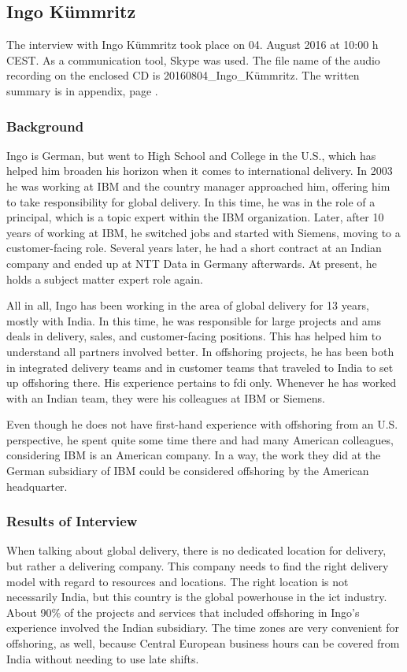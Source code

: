 \subsection{Ingo K\"ummritz}
The interview with Ingo K\"ummritz took place on 04. August 2016 at 10:00 h CEST. As a communication tool, Skype was used. The file name of the audio recording on the enclosed CD is 20160804\_Ingo\_K\"ummritz. The written summary is in appendix, page \pageref{int:Ingo}.

\subsubsection{Background}
Ingo is German, but went to High School and College in the U.S., which has helped him broaden his horizon when it comes to international delivery. In 2003 he was working at IBM and the country manager approached him, offering him to take responsibility for global delivery. In this time, he was in the role of a principal, which is a topic expert within the IBM organization. Later, after 10 years of working at IBM, he switched jobs and started with Siemens, moving to a customer-facing role. Several years later, he had a short contract at an Indian company and ended up at NTT Data in Germany afterwards. At present, he holds a subject matter expert role again.

All in all, Ingo has been working in the area of global delivery for 13 years, mostly with India. In this time, he was responsible for large projects and \gls{ams} deals in delivery, sales, and customer-facing positions. This has helped him to understand all partners involved better. In offshoring projects, he has been both in integrated delivery teams and in customer teams that traveled to India to set up offshoring there. His experience pertains to \gls{fdi} only. Whenever he has worked with an Indian team, they were his colleagues at IBM or Siemens.

Even though he does not have first-hand experience with offshoring from an U.S. perspective, he spent quite some time there and had many American colleagues, considering IBM is an American company. In a way, the work they did at the German subsidiary of IBM could be considered offshoring by the American headquarter.

\subsubsection{Results of Interview}
When talking about global delivery, there is no dedicated location for delivery, but rather a delivering company. This company needs to find the right delivery model with regard to resources and locations. The right location is not necessarily India, but this country is the global powerhouse in the \gls{ict} industry. About 90\% of the projects and services that included offshoring in Ingo's experience involved the Indian subsidiary. The time zones are very convenient for offshoring, as well, because Central European business hours can be covered from India without needing to use late shifts.

